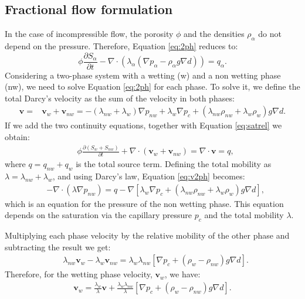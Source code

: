 \documentclass[times,final]{elsarticle}
\begin{document}
\subsection{Fractional flow formulation}
\hspace{0.5cm}In the case of incompressible flow, the porosity $\phi$ and the densities $\rho_{\alpha}$ do not depend on the pressure. Therefore, Equation \eqref{eq:2ph} reduces to: 
\begin{equation}\label{eq:2ph1}
 \phi \frac{\partial S_{\alpha}}{\partial t}-\nabla \cdot (  \lambda_{\alpha}(\nabla p_{\alpha}-\rho_{\alpha}g \nabla d))= q_{\alpha}.
\end{equation}
Considering a two-phase system with a wetting (w) and a non wetting phase (nw), we need to solve Equation \eqref{eq:2ph} for each phase. 
To solve it, we define the total Darcy's velocity as the sum of the velocity in both phases:
\begin{align}\label{eq:totv}
\mathbf{v}=&\mathbf{v}_w+\mathbf{v}_{nw}=-(\lambda_{nw}+\lambda_w)\nabla p_{nw}+\lambda_w\nabla p_c+(\lambda_{nw} \rho_{nw}+\lambda_w\rho_w)g\nabla d.
\end{align}
If we add the two continuity equations, together with Equation \eqref{eq:satrel} we obtain:
\begin{align}\label{eq:v2ph}
& \phi\frac{\partial( {S}_{w}+S_{nw})}{\partial t}+\nabla \cdot ( \mathbf{v}_{w}+\mathbf{v}_{nw})=  \nabla \cdot \mathbf{v}=q, 
\end{align}
where $q=q_{nw}+q_w$ is the total source term. Defining the total mobility as $\lambda=\lambda_{nw}+\lambda_w$, and using Darcy's law, Equation \eqref{eq:v2ph} becomes:
\begin{align}\label{eq:pnw}
&-\nabla \cdot (\lambda \nabla p_{nw})=q-\nabla[\lambda_w\nabla p_c+(\lambda_{nw}\rho_{nw}+\lambda_w\rho_w)g\nabla d],
\end{align}
which is an equation for the pressure of the non wetting phase. This equation depends on the saturation via the capillary pressure $p_c$ and the total mobility $\lambda$.\par
Multiplying each phase velocity by the relative mobility of the other phase and subtracting the result we get:
\begin{align}\label{eq:mobeq}
&\lambda_{nw}\mathbf{v}_w-\lambda_w\mathbf{v}_{nw}=\lambda_w\lambda_{nw} [\nabla p_c+(\rho_w-\rho_{nw})g\nabla d].
\end{align}
Therefore, for the wetting phase velocity, $\mathbf{v}_w$, we have:
\begin{align}\label{eq:vw}
\mathbf{v}_w=\frac{\lambda_w}{\lambda}\mathbf{v}+\frac{\lambda_w\lambda_{nw}}{\lambda} [\nabla p_c+(\rho_w-\rho_{nw})g\nabla d].
\end{align}
\end{document}
